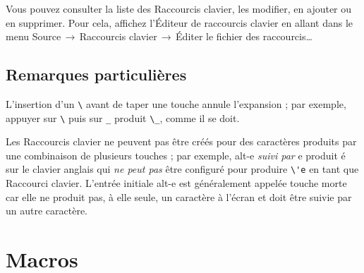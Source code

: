 \documentclass[11pt,french]{article}
\newcommand{\mnu}[1]{\textsf{#1}}
\newcommand{\cmd}[1]{\textsf{#1}}
\newcommand{\To}{\,\(\to\)\,}
\begin{document}
Vous pouvez consulter la liste des \cmd{Raccourcis clavier}, les modifier, en ajouter ou en supprimer. Pour cela, affichez l'\cmd{Éditeur de raccourcis clavier} en allant dans le menu \mnu{Source}\To\mnu{Raccourcis clavier}\To\mnu{Éditer le fichier des raccourcis…}


\subsection{Remarques particulières}


 

L'insertion d'un \verb+\+ avant de taper une touche annule l'expansion ; par exemple, appuyer sur \verb+\+ puis sur \verb+_+ produit \verb+\_+, comme il se doit.

Les \cmd{Raccourcis clavier} ne peuvent pas être créés pour des caractères produits par une combinaison de plusieurs touches ; par exemple, \cmd{alt-e} \emph{suivi par} e produit é sur le clavier anglais qui \emph{ne peut pas} être configuré pour produire \verb+\'e+ en tant que \cmd{Raccourci clavier}. L'entrée initiale \cmd{alt-e} est généralement appelée \cmd{touche morte} car elle ne produit pas, à elle seule, un caractère à l'écran et doit être suivie par un autre caractère.

\section{\cmd{Macros}}

\end{document}
